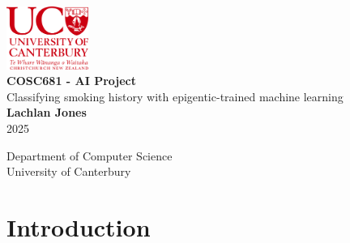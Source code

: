 \documentclass{article}
\begin{document}
\doublespacing


\begin{titlepage}
    \centering
    \singlespacing
    \vspace*{1cm}

    \includegraphics[width=0.2\textwidth]{University_of_Canterbury_logo.svg.png}\\[1.5cm]

    \Huge
    \textbf{COSC681 - AI Project}\\[1.5cm]

    \LARGE
    Classifying smoking history with epigentic-trained machine learning\\[2cm]

    \Large
    \textbf{Lachlan Jones}\\[0.5cm]
    2025

    \vfill

    \Large
    Department of Computer Science\\
    University of Canterbury
\end{titlepage}


\begin{abstract}

\end{abstract}

\newpage
\tableofcontents

\listoffigures

\listoftables

\newpage
{}

\section{Introduction}
\end{document}

